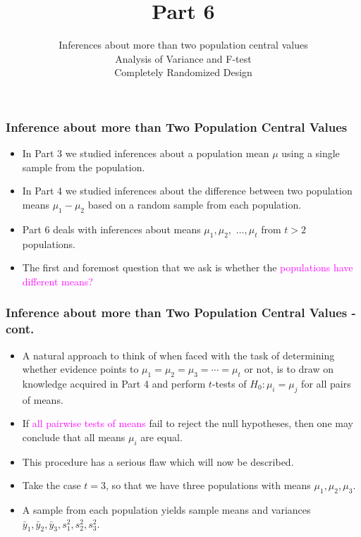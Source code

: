 \documentclass[xcolor=dvipsnames,12pt]{beamer}
\title[]{Part 6}
\author[Stat 801]{Inferences about more than two population central values\\
Analysis of Variance and F-test\\
Completely Randomized Design\\}
\date{}
\begin{document}
\begin{frame}[plain]
  \titlepage
\end{frame}




\begin{frame}
\frametitle{Inference about more than Two Population Central Values}
\begin{itemize}
\item In Part 3 we studied inferences about a population mean $\mu$
using a single sample from the population.
\item In Part 4 we studied inferences about the difference between two
population means $\mu_1 - \mu_2$ based on a random sample from each
population.
\item Part 6 deals with inferences about means 
$\mu_1, \mu_2,$ $ \ldots, \mu_t$ from $t > 2$ 
populations. 
\item The first and foremost question
that we ask is whether the  \textcolor{magenta}{populations have different means?}  
\end{itemize}
\end{frame}



\begin{frame}
\frametitle{Inference about more than Two Population Central Values - cont.}
\begin{itemize}
\item A natural approach to think of when faced with the task of
determining whether evidence points to $\mu_1 = \mu_2 = \mu_3 =
\cdots = \mu_t$ or not, is to draw on knowledge acquired in Part 4 and
perform $t$-tests of $H_0: \mu_i = \mu_j$ for all pairs of means.
\item If  \textcolor{magenta}{all pairwise tests of means} fail to reject the null hypotheses, then one
may conclude that all means $\mu_i$ are equal. 
\item This procedure has
a serious flaw which will now be described.
\item Take the case $t=3$, so that we have three populations with means
$\mu_1, \mu_2, \mu_3$. 
\item A sample from each population yields
sample means and variances $\bar{y}_1, \bar{y}_2, \bar{y}_3,
s_1^2, s_2^2, s_3^2$.
\end{itemize}
\end{frame}
\end{document}
